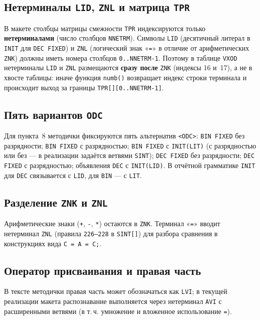 \documentclass[a4paper,14pt]{extarticle}
\begin{document}
\subsection{Нетерминалы \texttt{LID}, \texttt{ZNL} и матрица \texttt{TPR}}

В макете столбцы матрицы смежности \texttt{TPR} индексируются только
\textbf{нетерминалами} (число столбцов \texttt{NNETRM}). Символы \texttt{LID}
(десятичный литерал в \texttt{INIT} для \texttt{DEC FIXED}) и \texttt{ZNL}
(логический знак «\texttt{=}» в отличие от арифметических \texttt{ZNK}) должны
иметь номера столбцов \texttt{0..NNETRM-1}. Поэтому в таблице \texttt{VXOD}
нетерминалы \texttt{LID} и \texttt{ZNL} размещаются \textbf{сразу после}
\texttt{ZNK} (индексы 16 и~17), а не в хвосте таблицы: иначе функция
\texttt{numb()} возвращает индекс строки терминала и происходит выход за границы
\texttt{TPR[][0..NNETRM-1]}.

\subsection{Пять вариантов \texttt{ODC}}

Для пункта~8 методички фиксируются пять альтернатив \texttt{<ODC>}:
\texttt{BIN FIXED} без разрядности; \texttt{BIN FIXED} с разрядностью;
\texttt{BIN FIXED} с \texttt{INIT(LIT)} (с разрядностью или без --- в
реализации задаётся ветвями \texttt{SINT}); \texttt{DEC FIXED} без разрядности;
\texttt{DEC FIXED} с разрядностью; объявления \texttt{DEC} с \texttt{INIT(LID)}.
В отчётной грамматике \texttt{INIT} для \texttt{DEC} связывается с
\texttt{LID}, для \texttt{BIN} --- с \texttt{LIT}.

\subsection{Разделение \texttt{ZNK} и \texttt{ZNL}}

Арифметические знаки (\texttt{+}, \texttt{-}, \texttt{*}) остаются в
\texttt{ZNK}. Терминал «\texttt{=}» вводит нетерминал \texttt{ZNL} (правила
\texttt{226--228} в \texttt{SINT[]}) для разбора сравнения в конструкциях вида
\texttt{C = A = C;}.

\subsection{Оператор присваивания и правая часть}

В тексте методички правая часть может обозначаться как \texttt{LVI}; в текущей
реализации макета распознавание выполняется через нетерминал \texttt{AVI} с
расширенными ветвями (в т.\,ч. умножение и вложенное использование
\texttt{=}).
\end{document}
